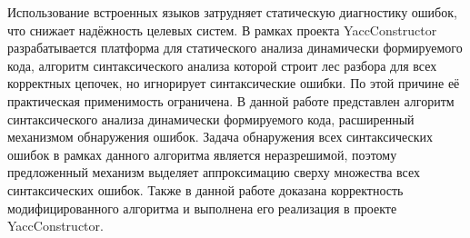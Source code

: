 Использование встроенных языков затрудняет статическую диагностику ошибок, что снижает надёжность целевых систем. В рамках проекта YaccConstructor разрабатывается платформа для статического анализа динамически формируемого кода, алгоритм синтаксического анализа которой строит лес разбора для всех корректных цепочек, но игнорирует синтаксические ошибки. По этой причине её практическая применимость ограничена. В данной работе представлен алгоритм синтаксического анализа динамически формируемого кода, расширенный механизмом обнаружения ошибок. Задача обнаружения всех синтаксических ошибок в рамках данного алгоритма является неразрешимой, поэтому предложенный механизм выделяет аппроксимацию сверху множества всех синтаксических ошибок. Также в данной работе доказана корректность модифицированного алгоритма и выполнена его реализация в проекте YaccConstructor.